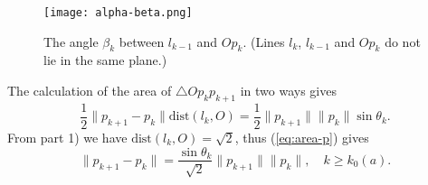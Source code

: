 \documentclass[12pt]{article}
\begin{document}
\begin{figure}[htbp]
  \begin{center}
  \texttt{[image: alpha-beta.png]}
  \end{center}
  \captionsetup{width=0.75\textwidth} 
  \caption{The angle $\beta_{k}$ between $l_{k-1}$ and $Op_{k}$. (Lines $l_k$, $l_{k-1}$ and $Op_{k}$ do not lie in the same plane.) }
  \label{fig:alpha-beta}
\end{figure}
The calculation of the area of $\triangle Op_k p_{k+1}$ in two ways gives
\begin{equation}\label{eq:area-p}
\frac{1}{2}\|p_{k+1} - p_{k}\| \text{dist}(l_{k}, O) =\frac{1}{2} \|p_{k+1}\|\|p_{k}\|\sin \theta_{k}.
\end{equation}
From part 1) we have $\text{dist}(l_{k}, O)=\sqrt{2}$, 
thus (\ref{eq:area-p}) gives
\begin{equation}\label{eq:lk-distance}
  \|p_{k+1} - p_{k}\| = \frac{\sin \theta_k}{\sqrt{2}}\|p_{k+1}\|\|p_{k}\|,
\quad 
k\geq k_0(a).
\end{equation}
\end{document}
